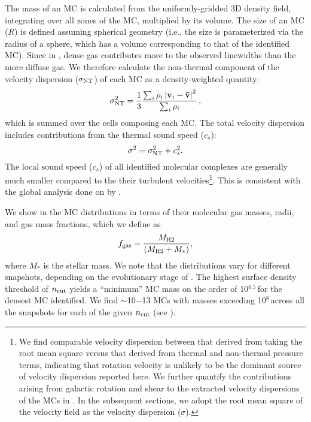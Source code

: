 \documentclass[iop]{emulateapj}
\newcommand{\AP}[1]{({\bf \color{apcolor} AP: #1})}
\begin{document}
The mass of an MC is calculated from the uniformly-gridded 3D density field,
integrating over all zones of the MC, multiplied by its volume. 
The size of an MC ($R$) is defined assuming spherical geometry (i.e., 
the size is parameterized via the radius of a sphere, which has a volume corresponding to that of the identified MC).
Since in \obs, dense gas contributes more to the observed linewidths than the more diffuse gas. We therefore calculate 
the non-thermal component of the velocity dispersion ($\sigma_{\rm NT}$) of each MC as a density-weighted quantity:
\begin{equation}
\sigma_{\rm NT}^2 = \frac{1}{{3}}\frac{\sum_{i} \rho_i \left|\mathbf{v}_i - \mathbf{\bar v}\right|^2}{\sum_i \rho_i}\,,
\end{equation}
which is summed over the cells composing each MC.
The total velocity dispersion includes contributions from the thermal sound speed ($c_s$):
\begin{equation}
\sigma^2 = \sigma_{\rm NT}^2 + c_s^2.
\end{equation}
The local sound speed ($c_s$)
of all identified molecular complexes are generally much smaller compared to the their
turbulent velocities\footnote{We find comparable velocity dispersion between that derived from 
taking the root mean square versus that derived from thermal and non-thermal pressure terms, indicating that
rotation velocity is unlikely to be the dominant source of velocity dispersion reported here.
We further quantify the contributions arising from galactic rotation and shear to the extracted velocity dispersions of the MCs in .
In the subsequent sections, we adopt the root mean square of the velocity field
as the velocity dispersion ($\sigma$).}.
This is consistent with the global analysis done on \flower by \citet{Vallini18a}.


We show in  the MC distributions in terms of their
molecular gas masses, radii, and gas mass fractions, which we define as 
\begin{equation}
f_{\rm gas} = \frac{M_{\rm H2}} {\left(M_{\rm H2} + M_*\right)},
\end{equation}
where $M_*$ is the stellar mass.
We note that the distributions vary for different snapshots, depending on the evolutionary stage of \flower.
The highest surface density threshold of $n_{\rm cut}$ yields a ``minimum'' MC mass on
the order of 10$^{6.5}$\,\Msun for the densest MC identified. 
We find $\sim$10$-$13 MCs with masses exceeding 10$^8$\,\Msun across all the
snapshots for each of the given $n_{\rm cut}$ (see ).
\end{document}
